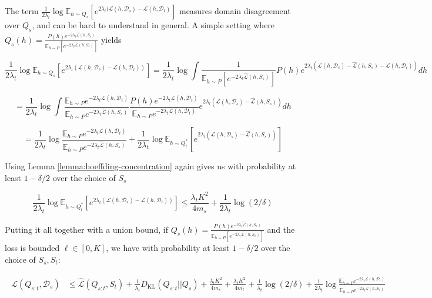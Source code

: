 \documentclass[letterpaper]{article}
\theoremstyle{definition}
\begin{document}
The term $\frac{1}{2\lambda_t}\log \mathbb{E}_{h\sim Q_{s}}\left [e^{2\lambda_t(\mathcal{L}(h,\mathcal{D}_s)-\mathcal{L}(h,\mathcal{D}_t)}\right ]$ measures domain disagreement over $Q_s$, and can be hard to understand in general. A simple setting where $Q_s(h)=\frac{P(h)e^{-2\lambda_t\hat{\mathcal{L}}(h,S_s)}}{\mathbb{E}_{h\sim P}\left [e^{-2\lambda_t\hat{\mathcal{L}}(h,S_s)} \right ]}$ yields 

$$\frac{1}{2\lambda_t}\log \mathbb{E}_{h\sim Q_{s}}\left [e^{2\lambda_t(\mathcal{L}(h,\mathcal{D}_s)-\mathcal{L}(h,\mathcal{D}_t))}\right ]=\frac{1}{2\lambda_t}\log \int \frac{1}{\mathbb{E}_{h\sim P}\left [e^{-2\lambda_t\hat{\mathcal{L}}(h,S_s)} \right ]}P(h)e^{2\lambda_t(\mathcal{L}(h,\mathcal{D}_s)-\hat{\mathcal{L}}(h,S_s)-\mathcal{L}(h,\mathcal{D}_t))}dh$$

$$=\frac{1}{2\lambda_t}\log \int \frac{\mathbb{E}_{h\sim P} e^{-2\lambda_t\mathcal{L}(h,\mathcal{D}_t)}}{\mathbb{E}_{h\sim P} e^{-2\lambda_t\hat{\mathcal{L}}(h,S_s)}  }\frac{P(h)e^{-2\lambda_t\mathcal{L}(h,\mathcal{D}_t)}}{\mathbb{E}_{h\sim P} e^{-2\lambda_t\mathcal{L}(h,\mathcal{D}_t)}}e^{2\lambda_t(\mathcal{L}(h,\mathcal{D}_s)-\hat{\mathcal{L}}(h,S_s))}dh$$

$$=\frac{1}{2\lambda_t}\log\frac{\mathbb{E}_{h\sim P} e^{-2\lambda_t\mathcal{L}(h,\mathcal{D}_t)}}{\mathbb{E}_{h\sim P} e^{-2\lambda_t\hat{\mathcal{L}}(h,S_s)}  }+\frac{1}{2\lambda_t}\log\mathbb{E}_{h\sim Q^{*}_t}\left [e^{2\lambda_t(\mathcal{L}(h,\mathcal{D}_s)-\hat{\mathcal{L}}(h,S_s))}\right ]$$

Using Lemma \ref{lemma:hoeffding-concentration} again gives us with probability at least $1-\delta/2$ over the choice of $S_s$

$$\frac{1}{2\lambda_t}\log \mathbb{E}_{h\sim Q^{*}_t}\left [e^{2\lambda_t(\mathcal{L}(h,\mathcal{D}_s)-\mathcal{L}(h,\mathcal{D}_t))}\right ] \leq \frac{\lambda_t K^2}{4m_s}+\frac{1}{2\lambda_t}\log(2/\delta)$$

Putting it all together with a union bound, if $Q_s(h)=\frac{P(h)e^{-2\lambda_t\hat{\mathcal{L}}(h,S_s)}}{\mathbb{E}_{h\sim P}\left [e^{-2\lambda_t\hat{\mathcal{L}}(h,S_s)} \right ]}$ and the loss is bounded $\ell\in[0,K]$, we have with probability at least $1-\delta/2$ over the choice of $S_s,S_t$:

\begin{align}
\begin{split}
\mathcal{L}(Q_{s:t}, \mathcal{D}_s) &\leq \hat{\mathcal{L}}(Q_{s:t}, S_t) + \frac{1}{\lambda_t} D_{\mathrm{KL}}(Q_{s:t}||Q_{s})
+\frac{\lambda_t K^2}{4m_s}+\frac{\lambda_t K^2}{4m_t}+\frac{1}{\lambda_t}\log(2/\delta)+\frac{1}{2\lambda_t}\log\frac{\mathbb{E}_{h\sim P} e^{-2\lambda_t\mathcal{L}(h,\mathcal{D}_t)}}{\mathbb{E}_{h\sim P} e^{-2\lambda_t\hat{\mathcal{L}}(h,S_s)}  }
\end{split}
\end{align}
\end{document}
